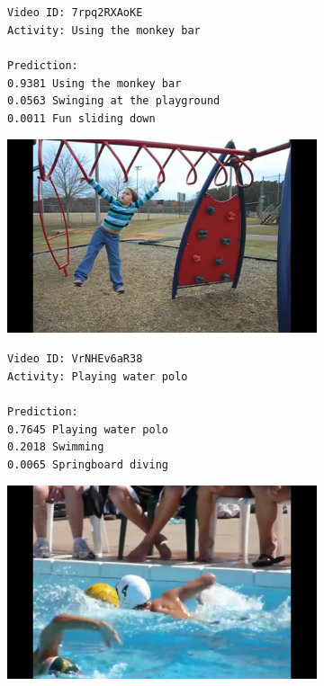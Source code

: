 \begin{figure}[H]
\begin{subfigure}[b]{.4\textwidth}
  \texttt{Video ID: 7rpq2RXAoKE \\
  Activity: Using the monkey bar \\
  \\
  Prediction: \\
  0.9381	Using the monkey bar \\
  0.0563	Swinging at the playground \\
  0.0011	Fun sliding down \\}
\end{subfigure}%
\begin{subfigure}[b]{.6\textwidth}
  \centering
\includegraphics[width=0.95\linewidth]{img/results/results_visualization_classification_3}
\end{subfigure}

\begin{subfigure}[b]{.4\textwidth}
  \texttt{Video ID: VrNHEv6aR38 \\
  Activity: Playing water polo \\
  \\
  Prediction: \\
  0.7645	Playing water polo \\
  0.2018	Swimming \\
  0.0065	Springboard diving\\}
\end{subfigure}%
\begin{subfigure}[b]{.6\textwidth}
  \centering
\includegraphics[width=0.95\linewidth]{img/results/results_visualization_classification_4}
\end{subfigure}


\end{figure}
